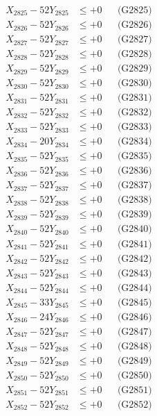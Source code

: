 \documentclass[a4paper,10pt]{article}
\begin{document}
{\begin{align}
X_{2825} - 52Y_{2825} &\leq +0 && \text{(G2825)} \\
X_{2826} - 52Y_{2826} &\leq +0 && \text{(G2826)} \\
X_{2827} - 52Y_{2827} &\leq +0 && \text{(G2827)} \\
X_{2828} - 52Y_{2828} &\leq +0 && \text{(G2828)} \\
X_{2829} - 52Y_{2829} &\leq +0 && \text{(G2829)} \\
X_{2830} - 52Y_{2830} &\leq +0 && \text{(G2830)} \\
\allowbreak
X_{2831} - 52Y_{2831} &\leq +0 && \text{(G2831)} \\
X_{2832} - 52Y_{2832} &\leq +0 && \text{(G2832)} \\
X_{2833} - 52Y_{2833} &\leq +0 && \text{(G2833)} \\
X_{2834} - 20Y_{2834} &\leq +0 && \text{(G2834)} \\
X_{2835} - 52Y_{2835} &\leq +0 && \text{(G2835)} \\
X_{2836} - 52Y_{2836} &\leq +0 && \text{(G2836)} \\
X_{2837} - 52Y_{2837} &\leq +0 && \text{(G2837)} \\
X_{2838} - 52Y_{2838} &\leq +0 && \text{(G2838)} \\
X_{2839} - 52Y_{2839} &\leq +0 && \text{(G2839)} \\
X_{2840} - 52Y_{2840} &\leq +0 && \text{(G2840)} \\
\allowbreak
X_{2841} - 52Y_{2841} &\leq +0 && \text{(G2841)} \\
X_{2842} - 52Y_{2842} &\leq +0 && \text{(G2842)} \\
X_{2843} - 52Y_{2843} &\leq +0 && \text{(G2843)} \\
X_{2844} - 52Y_{2844} &\leq +0 && \text{(G2844)} \\
X_{2845} - 33Y_{2845} &\leq +0 && \text{(G2845)} \\
X_{2846} - 24Y_{2846} &\leq +0 && \text{(G2846)} \\
X_{2847} - 52Y_{2847} &\leq +0 && \text{(G2847)} \\
X_{2848} - 52Y_{2848} &\leq +0 && \text{(G2848)} \\
X_{2849} - 52Y_{2849} &\leq +0 && \text{(G2849)} \\
X_{2850} - 52Y_{2850} &\leq +0 && \text{(G2850)} \\
\allowbreak
X_{2851} - 52Y_{2851} &\leq +0 && \text{(G2851)} \\
X_{2852} - 52Y_{2852} &\leq +0 && \text{(G2852)} \\

\end{align}}
\end{document}
